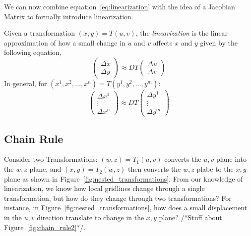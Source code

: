 \documentclass[11pt]{article}
\newenvironment{mybox}
{\begin{tcolorbox}[colback=red!5!white,colframe=red!75!black]}
{\end{tcolorbox}}
\begin{document}
\noindent We can now combine equation~\ref{eq:linearization} with the idea of a Jacobian Matrix to formally introduce linearization.
\begin{mybox}
    Given a transformation $(x,y)=T(u,v)$, the \textit{linearization} is the linear approximation of how a small change in $u$ and $v$ affects $x$ and $y$ given by the following equation,
\begin{equation*}
\begin{pmatrix} \Delta x \\ \Delta y \end{pmatrix}
    \approx DT
    \begin{pmatrix} \Delta u \\ \Delta v \end{pmatrix}
\end{equation*}
    In general, for $(x^1,x^2,\ldots,x^n) = T(y^1,y^2,\ldots,y^m)$:
\begin{equation*}
    \begin{pmatrix} \Delta x^1 \\ \vdots \\ \Delta x^n \end{pmatrix}
    \approx DT
    \begin{pmatrix} \Delta y^1 \\ \vdots \\ \Delta y^m \end{pmatrix}
\end{equation*}
\end{mybox}
\subsection{Chain Rule}
Consider two Transformations: $(w,z) = T_1(u,v)$ converts the $u,v$ plane into the $w,z$ plane, and $(x,y) = T_2(w,z)$ then converts the $w,z$ plabe to the $x,y$ plane as shown in Figure~\ref{fig:nested_transformations}. From our knowledge of linearization, we know how local gridlines change through a single transformation, but how do they change through two transformations? For instance, in Figure~\ref{fig:nested_transformations}, how does a small displacement in the $u,v$ direction translate to change in the $x,y$ plane? /*Stuff about Figure~\ref{fig:chain_rule2}*/.
\end{document}
